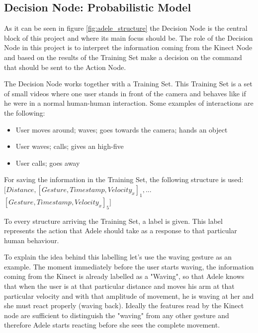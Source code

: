 \subsection{Decision Node: Probabilistic Model}
As it can be seen in figure \ref{fig:adele_structure} the Decision Node is the central block of this project and where its main focus should be. The role of the Decision Node in this project is to interpret the information coming from the Kinect Node and based on the results of the Training Set make a decision on the command that should be sent to the Action Node.

The Decision Node works together with a Training Set. This Training Set is a set of small videos where one user stands in front of the camera and behaves like if he were in a normal human-human interaction. Some examples of interactions are the following:
\begin{itemize}
\item User moves around; waves; goes towards the camera; hands an object
\item User waves; calls; gives an high-five
\item User calls; goes away
\end{itemize}
For saving the information in the Training Set, the following structure is used:\\

$\big[Distance, [Gesture, Timestamp, Velocity_x]_1,...$\\$
[Gesture, Timestamp, Velocity_x]_5\big]$

To every structure arriving the Training Set, a label is given. This label represents the action that Adele should take as a response to that particular human behaviour.

To explain the idea behind this labelling let's use the waving gesture as an example. The moment immediately before the user starts waving, the information coming from the Kinect is already labelled as a "Waving", so that Adele knows that when the user is at that particular distance and moves his arm at that particular velocity and with that amplitude of movement, he is waving at her and she must react properly (waving back). Ideally the features read by the Kinect node are sufficient to distinguish the "waving" from any other gesture and therefore Adele starts reacting before she sees the complete movement.

